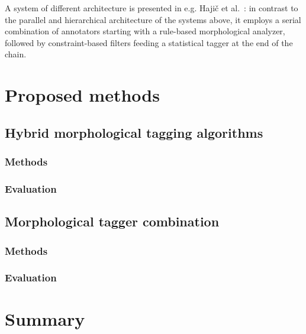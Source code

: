 A system of different architecture is presented in e.g.
Hajič et al.~\cite{}: in contrast to the parallel and hierarchical architecture of the systems above, it employs a serial combination of annotators starting with a rule-based morphological analyzer, followed by constraint-based filters feeding a statistical tagger at the end of the chain.

\section{Proposed methods}

\subsection{Hybrid morphological tagging algorithms}

\subsubsection{Methods}

\subsubsection{Evaluation}

\subsection{Morphological tagger combination}

\subsubsection{Methods}

\subsubsection{Evaluation}

\section{Summary}

 
